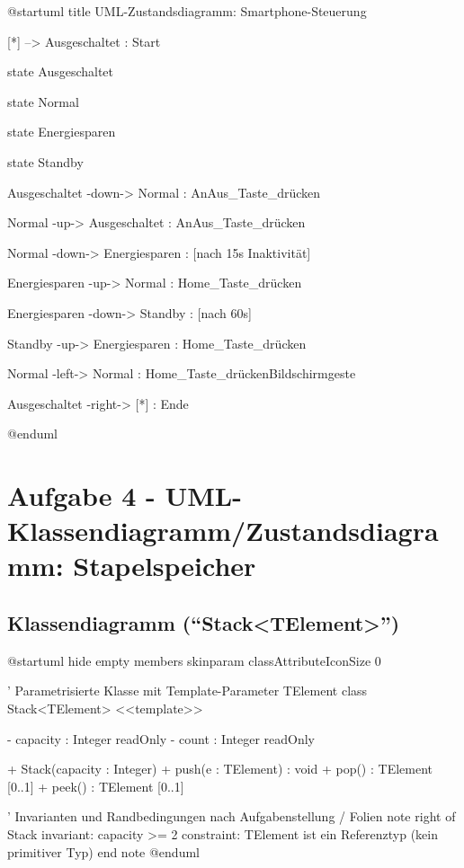 \documentclass[12pt]{article}
\begin{document}
\begin{plantuml}
@startuml
title UML-Zustandsdiagramm: Smartphone-Steuerung

[*] --> Ausgeschaltet : Start

state Ausgeschaltet

state Normal 

state Energiesparen

state Standby

Ausgeschaltet -down-> Normal : AnAus_Taste_drücken

Normal -up-> Ausgeschaltet : AnAus_Taste_drücken

Normal -down-> Energiesparen : [nach 15s Inaktivität]

Energiesparen -up-> Normal : Home_Taste_drücken

Energiesparen -down-> Standby : [nach 60s]

Standby -up-> Energiesparen : Home_Taste_drücken

Normal -left-> Normal : Home_Taste_drücken\noder Bildschirmgeste

Ausgeschaltet -right-> [*] : Ende

@enduml
  
\end{plantuml}


\section*{Aufgabe 4 - UML-Klassendiagramm/Zustandsdiagramm: Stapelspeicher}

\subsection*{Klassendiagramm (\enquote{Stack<TElement>})}
\def\PlantUMLJobname{SWT-class}
\begin{plantuml}
@startuml
hide empty members
skinparam classAttributeIconSize 0

' Parametrisierte Klasse mit Template-Parameter TElement
class Stack<TElement> <<template>> {
  - capacity : Integer {readOnly}
  - count    : Integer {readOnly}

  + Stack(capacity : Integer)
  + push(e : TElement) : void
  + pop()  : TElement [0..1]
  + peek() : TElement [0..1]
}

' Invarianten und Randbedingungen nach Aufgabenstellung / Folien
note right of Stack
  {invariant: capacity >= 2}
  {constraint: TElement ist ein Referenztyp (kein primitiver Typ)}
end note
@enduml
\end{plantuml}
\end{document}
